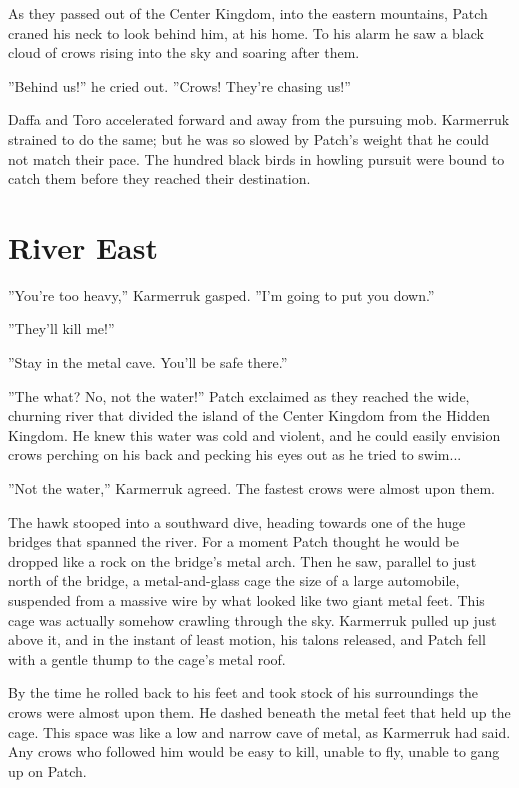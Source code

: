 \documentclass[12pt]{book}
\begin{document}
As they passed out of the Center Kingdom, into the eastern mountains, Patch craned his neck to look behind him, at his home. To his alarm he saw a black cloud of crows rising into the sky and soaring after them.

''Behind us!'' he cried out. ''Crows! They're chasing us!''

Daffa and Toro accelerated forward and away from the pursuing mob. Karmerruk strained to do the same; but he was so slowed by Patch's weight that he could not match their pace. The hundred black birds in howling pursuit were bound to catch them before they reached their destination.


\section{River East}

''You're too heavy,'' Karmerruk gasped. ''I'm going to put you down.''

''They'll kill me!''

''Stay in the metal cave. You'll be safe there.''

''The what? No, not the water!'' Patch exclaimed as they reached the wide, churning river that divided the island of the Center Kingdom from the Hidden Kingdom. He knew this water was cold and violent, and he could easily envision crows perching on his back and pecking his eyes out as he tried to swim...

''Not the water,'' Karmerruk agreed. The fastest crows were almost upon them.

The hawk stooped into a southward dive, heading towards one of the huge bridges that spanned the river. For a moment Patch thought he would be dropped like a rock on the bridge's metal arch. Then he saw, parallel to just north of the bridge, a metal-and-glass cage the size of a large automobile, suspended from a massive wire by what looked like two giant metal feet. This cage was actually somehow crawling through the sky. Karmerruk pulled up just above it, and in the instant of least motion, his talons released, and Patch fell with a gentle thump to the cage's metal roof.

By the time he rolled back to his feet and took stock of his surroundings the crows were almost upon them. He dashed beneath the metal feet that held up the cage. This space was like a low and narrow cave of metal, as Karmerruk had said. Any crows who followed him would be easy to kill, unable to fly, unable to gang up on Patch.
\end{document}
